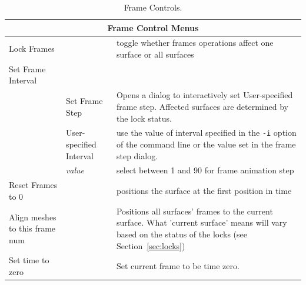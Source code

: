 \begin{table}[ht]
\caption{Frame Controls.}
  \begin{center}
    \begin{tabular}{|l|l|p{2.8 in}|} \hline
      \multicolumn{3}{|c|}{\textbf{Frame Control Menus}} \\ \hline
    Lock Frames  & & toggle whether frames 
        operations affect one surface or all surfaces \\ \hline
    Set Frame Interval & & \\
      & Set Frame Step & Opens a dialog to interactively set User-specified 
    frame step.  Affected surfaces are determined by the lock status.\\
      & User-specified Interval & use the value of interval specified in the 
        \texttt{-i} option of the command line or the value set in the
        frame step dialog.\\ 
      & \emph{value} & select between 1 and 90 for frame animation step \\
    Reset Frames to 0 & & positions the surface at the first position in time
       \\
    Align meshes to this frame num & & Positions all surfaces' frames to the
    current surface.  What 'current surface' means will vary based on the status
    of the locks (see Section~\ref{sec:locks})
    \\
    Set time to zero & & Set current frame to be time zero.
        \\ \hline
    \end{tabular}
  \end{center}
\end{table}

